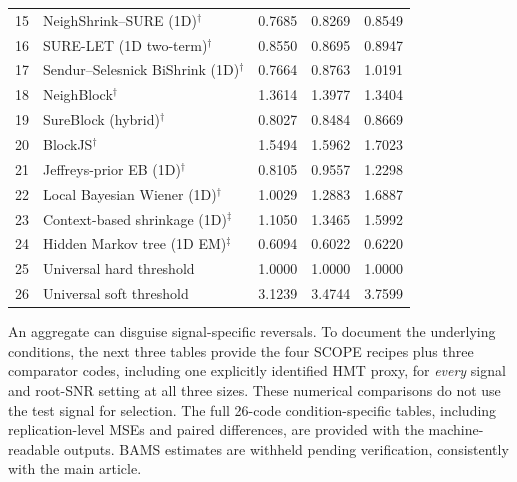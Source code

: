 \documentclass[11pt]{article}
\numberwithin{equation}{section}
\begin{document}
\begin{table}[H]
\begin{tabular}{r p{.58\linewidth}rrr}
15 & NeighShrink--SURE (1D)$^{\dagger}$ \citep{ZhouCheng2008NeighShrinkSURE} & 0.7685 & 0.8269 & 0.8549 \\
16 & SURE-LET (1D two-term)$^{\dagger}$ \citep{BluLuisier2007SURELET} & 0.8550 & 0.8695 & 0.8947 \\
17 & Sendur--Selesnick BiShrink (1D)$^{\dagger}$ \citep{SendurSelesnick2002BiShrink} & 0.7664 & 0.8763 & 1.0191 \\
18 & NeighBlock$^{\dagger}$ \citep{CaiSilverman2001Neigh} & 1.3614 & 1.3977 & 1.3404 \\
19 & SureBlock (hybrid)$^{\dagger}$ \citep{CaiZhou2009SureBlock} & 0.8027 & 0.8484 & 0.8669 \\
20 & BlockJS$^{\dagger}$ \citep{Cai1999BlockJS} & 1.5494 & 1.5962 & 1.7023 \\
21 & Jeffreys-prior EB (1D)$^{\dagger}$ \citep{FigueiredoNowak2001Jeffreys} & 0.8105 & 0.9557 & 1.2298 \\
22 & Local Bayesian Wiener (1D)$^{\dagger}$ \citep{MihcakEtAl1999LocalWiener} & 1.0029 & 1.2883 & 1.6887 \\
23 & Context-based shrinkage (1D)$^{\ddagger}$ \citep{ChangYuVetterli2000Context} & 1.1050 & 1.3465 & 1.5992 \\
24 & Hidden Markov tree (1D EM)$^{\ddagger}$ \citep{CrouseNowakBaraniuk1998HMT} & 0.6094 & 0.6022 & 0.6220 \\
25 & Universal hard threshold \citep{DonohoJohnstone1994} & 1.0000 & 1.0000 & 1.0000 \\
26 & Universal soft threshold \citep{DonohoJohnstone1994} & 3.1239 & 3.4744 & 3.7599 \\
\bottomrule
\end{tabular}
\end{table}


An aggregate can disguise signal-specific reversals. To document the
underlying conditions, the next three tables provide the four SCOPE
recipes plus three comparator codes, including one explicitly
identified HMT proxy, for \emph{every} signal and root-SNR setting at
all three sizes. These numerical comparisons do not use the test
signal for selection. The full 26-code condition-specific tables,
including replication-level MSEs and paired differences, are provided
with the machine-readable outputs.
BAMS estimates are withheld pending verification, consistently with the main article.
\end{document}
